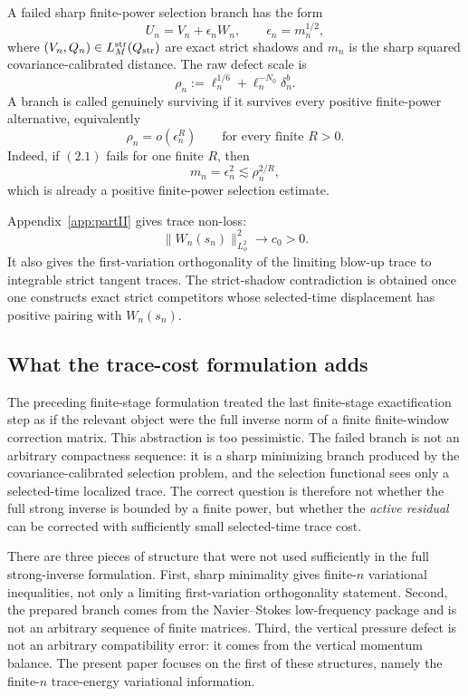 \documentclass[11pt]{article}
\numberwithin{equation}{section}
\theoremstyle{plain}
\theoremstyle{definition}
\theoremstyle{remark}
\newcommand{\str}{\mathrm{str}}
\begin{document}
A failed sharp finite-power selection branch has the form
\[
        U_n=V_n+\epsilon_n W_n,
        \qquad
        \epsilon_n=m_n^{1/2},
\]
where \((V_n,Q_n)\in L_M^{\str}(Q_{\rm str})\) are exact strict shadows and \(m_n\) is the sharp squared covariance-calibrated distance.  The raw defect scale is
\[
        \rho_n:=\ell_n^{1/6}+\ell_n^{-N_0}\delta_n^b.
\]
A branch is called genuinely surviving if it survives every positive finite-power alternative, equivalently
\[
        \rho_n=o(\epsilon_n^R)
        \qquad\text{for every finite }R>0.
        \tag{2.1}
\]
Indeed, if \((2.1)\) fails for one finite \(R\), then
\[
        m_n=\epsilon_n^2\lesssim \rho_n^{2/R},
\]
which is already a positive finite-power selection estimate.

Appendix~\ref{app:partII} gives trace non-loss:
\[
        \|W_n(s_n)\|_{L^2_\phi}^2\to c_0>0.
        \tag{2.2}
\]
It also gives the first-variation orthogonality of the limiting blow-up trace to integrable strict tangent traces.  The strict-shadow contradiction is obtained once one constructs exact strict competitors whose selected-time displacement has positive pairing with \(W_n(s_n)\).


\subsection{What the trace-cost formulation adds}
\label{pV:sec:what-trace-cost-adds}

The preceding finite-stage formulation treated the last finite-stage exactification step as if the relevant object were the
full inverse norm of a finite finite-window correction matrix.  This abstraction is too pessimistic.  The failed
branch is not an arbitrary compactness sequence: it is a sharp minimizing branch produced by
the covariance-calibrated selection problem, and the selection functional sees only a selected-time
localized trace.  The correct question is therefore not whether the full strong inverse is bounded
by a finite power, but whether the \emph{active residual} can be corrected with sufficiently small
selected-time trace cost.

There are three pieces of structure that were not used sufficiently in the full strong-inverse formulation.
First, sharp minimality gives finite-\(n\) variational inequalities, not only a limiting first-variation
orthogonality statement.  Second, the prepared branch comes from the Navier--Stokes low-frequency
package and is not an arbitrary sequence of finite matrices.  Third, the vertical pressure defect is
not an arbitrary compatibility error: it comes from the vertical momentum balance.  The present
paper focuses on the first of these structures, namely the finite-\(n\) trace-energy variational
information.
\end{document}
